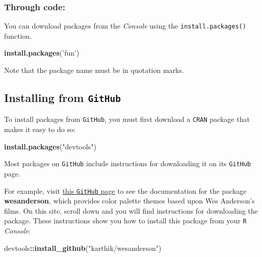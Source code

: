 \documentclass[]{book}
\newenvironment{Shaded}{\begin{snugshade}}{\end{snugshade}}
\newcommand{\KeywordTok}[1]{\textcolor[rgb]{0.13,0.29,0.53}{\textbf{#1}}}
\newcommand{\NormalTok}[1]{#1}
\newcommand{\OperatorTok}[1]{\textcolor[rgb]{0.81,0.36,0.00}{\textbf{#1}}}
\newcommand{\StringTok}[1]{\textcolor[rgb]{0.31,0.60,0.02}{#1}}
\begin{document}
\hypertarget{through-code}{%
\subsubsection*{Through code:}\label{through-code}}

You can download packages from the \emph{Console} using the \texttt{install.packages()} function.

\begin{Shaded}
\begin{Highlighting}[]
\KeywordTok{install.packages}\NormalTok{(}\StringTok{'fun'}\NormalTok{)}
\end{Highlighting}
\end{Shaded}

Note that the package name must be in quotation marks.

\hypertarget{installing-from-github}{%
\subsection*{\texorpdfstring{Installing from \texttt{GitHub}}{Installing from GitHub}}\label{installing-from-github}}

To install packages from \texttt{GitHub}, you must first download a \texttt{CRAN} package that makes it easy to do so:

\begin{Shaded}
\begin{Highlighting}[]
\KeywordTok{install.packages}\NormalTok{(}\StringTok{"devtools"}\NormalTok{)}
\end{Highlighting}
\end{Shaded}

Most packages on \texttt{GitHub} include instructions for downloading it on its \texttt{GitHub} page.

For example, visit \href{https://github.com/karthik/wesanderson}{this \texttt{GitHub} page} to see the documentation for the package \textbf{wesanderson}, which provides color palette themes based upon Wes Anderson's films. On this site, scroll down and you will find instructions for downloading the package. These instructions show you how to install this package from your \texttt{R} \emph{Console}:

\begin{Shaded}
\begin{Highlighting}[]
\NormalTok{devtools}\OperatorTok{::}\KeywordTok{install_github}\NormalTok{(}\StringTok{"karthik/wesanderson"}\NormalTok{)}
\end{Highlighting}
\end{Shaded}
\end{document}
